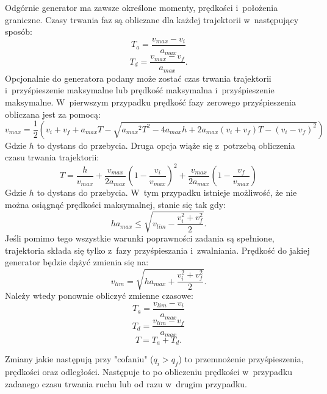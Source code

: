 \documentclass[a4paper, 12pt]{article}
\begin{document}
	\vspace{10px}
	\par Odgórnie generator ma zawsze określone momenty, prędkości i~położenia graniczne. Czasy trwania faz są obliczane dla każdej trajektorii w~następujący sposób:
	\begin{equation}
	\label{eq:ta1}
	T_a = \frac{v_{max}-v_i}{a_{max}}
	\end{equation}
	\begin{equation}
	\label{eq:td1}
	T_d = \frac{v_{max}-v_f}{a_{max}}.
	\end{equation}
	Opcjonalnie do generatora podany może zostać czas trwania trajektorii i~przyśpieszenie maksymalne lub prędkość maksymalna i~przyśpieszenie maksymalne. W~pierwszym przypadku prędkość fazy zerowego przyśpieszenia obliczana jest za pomocą:
	\begin{equation}
	\label{eq:vmax1}
	v_{max}=\frac{1}{2}(v_i+v_f+a_{max}T-\sqrt{{a_{max}}^2T^2-4a_{max}h+2a_{max}(v_i+v_f)T-(v_i-v_f)^2})
	\end{equation}
	{\footnotesize Gdzie $ h $ to dystans do przebycia.}\newline
	Druga opcja wiąże się z~potrzebą obliczenia czasu trwania trajektorii:
	\begin{equation}
	\label{eq:t1}
	T=\frac{h}{v_{max}}+\frac{v_{max}}{2a_{max}}(1-\frac{v_i}{v_{max}})^2+\frac{v_{max}}{2a_{max}}(1-\frac{v_f}{v_{max}})
	\end{equation}
	{\footnotesize Gdzie $ h $ to dystans do przebycia.}\newline
	W~tym przypadku istnieje możliwość, że nie można osiągnąć prędkości maksymalnej, stanie się tak gdy:
	\begin{equation}
	\label{eq:vmaxlim}
	ha_{max}\leq\sqrt{v_{lim}-\frac{v_i^2+v_f^2}{2}}.
	\end{equation}
	Jeśli pomimo tego wszystkie warunki poprawności zadania są spełnione, trajektoria składa się tylko z~fazy przyśpieszania i~zwalniania. Prędkość do jakiej generator będzie dążyć zmienia się na:
	\begin{equation}
	\label{eq:vlim}
	v_{lim}=\sqrt{ha_{max}+\frac{v_i^2+v_f^2}{2}}.
	\end{equation}
	Należy wtedy ponownie obliczyć zmienne czasowe:
	\begin{equation}
	\label{eq:ta2}
	T_a = \frac{v_{lim}-v_i}{a_{max}}
	\end{equation}
	\begin{equation}
	\label{eq:td2}
	T_d = \frac{v_{lim}-v_f}{a_{max}}
	\end{equation}
	\begin{equation}
	\label{eq:t2}
	T = T_a+T_d.
	\end{equation}
	\par Zmiany jakie następują przy "cofaniu" ($q_i>q_f$) to przemnożenie przyśpieszenia, prędkości oraz odległości. Następuje to po obliczeniu prędkości w~przypadku zadanego czasu trwania ruchu lub od razu w~drugim przypadku.
	
\end{document}
